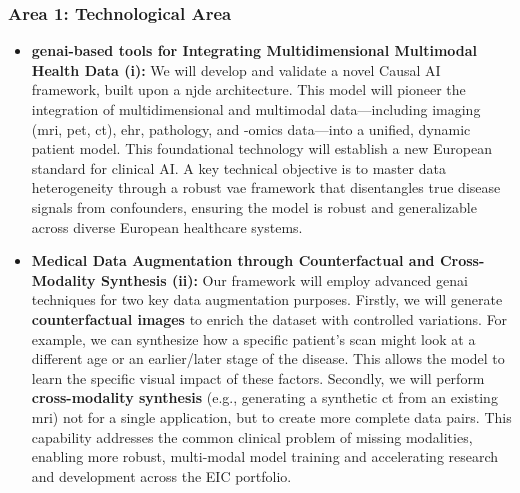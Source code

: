 \documentclass[11pt, a4paper]{article}
\begin{document}
\subsubsection*{Area 1: Technological Area}
\begin{itemize}
    \item \textbf{\gls{genai}-based tools for Integrating Multidimensional Multimodal Health Data (i):} We will develop and validate a novel Causal AI framework, built upon a \gls{njde} architecture. This model will pioneer the integration of multidimensional and multimodal data—including imaging (\gls{mri}, \gls{pet}, \gls{ct}), \gls{ehr}, pathology, and -omics data—into a unified, dynamic patient model. This foundational technology will establish a new European standard for clinical AI. A key technical objective is to master data heterogeneity through a robust \gls{vae} framework that disentangles true disease signals from confounders, ensuring the model is robust and generalizable across diverse European healthcare systems.

    \item \textbf{Medical Data Augmentation through Counterfactual and Cross-Modality Synthesis (ii):} Our framework will employ advanced \gls{genai} techniques for two key data augmentation purposes. Firstly, we will generate \textbf{counterfactual images} to enrich the dataset with controlled variations. For example, we can synthesize how a specific patient's scan might look at a different age or an earlier/later stage of the disease. This allows the model to learn the specific visual impact of these factors. Secondly, we will perform \textbf{cross-modality synthesis} (e.g., generating a synthetic \gls{ct} from an existing \gls{mri}) not for a single application, but to create more complete data pairs. This capability addresses the common clinical problem of missing modalities, enabling more robust, multi-modal model training and accelerating research and development across the EIC portfolio.


\end{itemize}
\end{document}
